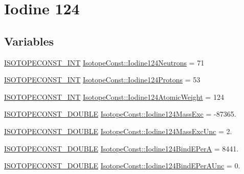 \hypertarget{group___isotope_const-_iodine-_i124}{}\section{Iodine 124}
\label{group___isotope_const-_iodine-_i124}
\subsection*{Variables}
\begin{DoxyCompactItemize}
\item 
\mbox{\hyperlink{group___isotope_const-_macros_ga5f18360b3e99483a35c32d789e62621c}{I\+S\+O\+T\+O\+P\+E\+C\+O\+N\+S\+T\+\_\+\+I\+NT}} \mbox{\hyperlink{group___isotope_const-_iodine-_i124_ga1264e979e5da40d5673129c81ef5069a}{Isotope\+Const\+::\+Iodine124\+Neutrons}} = 71
\item 
\mbox{\hyperlink{group___isotope_const-_macros_ga5f18360b3e99483a35c32d789e62621c}{I\+S\+O\+T\+O\+P\+E\+C\+O\+N\+S\+T\+\_\+\+I\+NT}} \mbox{\hyperlink{group___isotope_const-_iodine-_i124_ga76159cffb209b40bb4e29b3147ce30fa}{Isotope\+Const\+::\+Iodine124\+Protons}} = 53
\item 
\mbox{\hyperlink{group___isotope_const-_macros_ga5f18360b3e99483a35c32d789e62621c}{I\+S\+O\+T\+O\+P\+E\+C\+O\+N\+S\+T\+\_\+\+I\+NT}} \mbox{\hyperlink{group___isotope_const-_iodine-_i124_ga0d2933e7976fb17cbfafd8d483c3ea3d}{Isotope\+Const\+::\+Iodine124\+Atomic\+Weight}} = 124
\item 
\mbox{\hyperlink{group___isotope_const-_macros_ga8f45a7272ce02c0b4c65c44636ed719a}{I\+S\+O\+T\+O\+P\+E\+C\+O\+N\+S\+T\+\_\+\+D\+O\+U\+B\+LE}} \mbox{\hyperlink{group___isotope_const-_iodine-_i124_ga9f1d25ed87a09a9fb2151deab9ec67d7}{Isotope\+Const\+::\+Iodine124\+Mass\+Exc}} = -\/87365.
\item 
\mbox{\hyperlink{group___isotope_const-_macros_ga8f45a7272ce02c0b4c65c44636ed719a}{I\+S\+O\+T\+O\+P\+E\+C\+O\+N\+S\+T\+\_\+\+D\+O\+U\+B\+LE}} \mbox{\hyperlink{group___isotope_const-_iodine-_i124_ga965126266ba7cb42d7b9b8b67f1216b1}{Isotope\+Const\+::\+Iodine124\+Mass\+Exc\+Unc}} = 2.
\item 
\mbox{\hyperlink{group___isotope_const-_macros_ga8f45a7272ce02c0b4c65c44636ed719a}{I\+S\+O\+T\+O\+P\+E\+C\+O\+N\+S\+T\+\_\+\+D\+O\+U\+B\+LE}} \mbox{\hyperlink{group___isotope_const-_iodine-_i124_ga69ac46ce7fab4cb6d4b78951be0d137b}{Isotope\+Const\+::\+Iodine124\+Bind\+E\+PerA}} = 8441.
\item 
\mbox{\hyperlink{group___isotope_const-_macros_ga8f45a7272ce02c0b4c65c44636ed719a}{I\+S\+O\+T\+O\+P\+E\+C\+O\+N\+S\+T\+\_\+\+D\+O\+U\+B\+LE}} \mbox{\hyperlink{group___isotope_const-_iodine-_i124_ga48989b6d994f29a8ae6f7e09119080ef}{Isotope\+Const\+::\+Iodine124\+Bind\+E\+Per\+A\+Unc}} = 0.

\end{DoxyCompactItemize}
